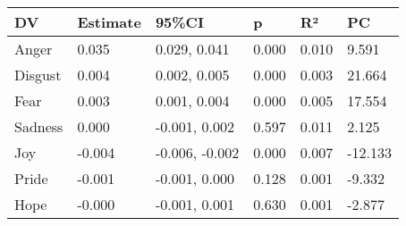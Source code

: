 \begin{tabular}{llllll}
\toprule
     DV & Estimate &         95\%CI &     p &    R² &  PC \\
\midrule
  Anger &    0.035 &   0.029, 0.041 & 0.000 & 0.010 &   9.591 \\
Disgust &    0.004 &   0.002, 0.005 & 0.000 & 0.003 &  21.664 \\
   Fear &    0.003 &   0.001, 0.004 & 0.000 & 0.005 &  17.554 \\
Sadness &    0.000 &  -0.001, 0.002 & 0.597 & 0.011 &   2.125 \\
    Joy &   -0.004 & -0.006, -0.002 & 0.000 & 0.007 & -12.133 \\
  Pride &   -0.001 &  -0.001, 0.000 & 0.128 & 0.001 &  -9.332 \\
   Hope &   -0.000 &  -0.001, 0.001 & 0.630 & 0.001 &  -2.877 \\
\bottomrule
\end{tabular}
